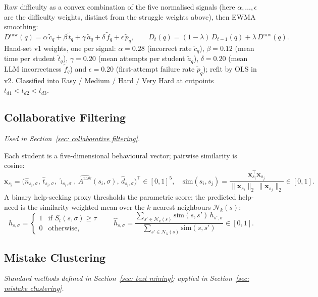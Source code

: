 Raw difficulty as a convex combination of the five normalised signals (here $\alpha,\ldots,\epsilon$ are the difficulty weights, distinct from the struggle weights above), then EWMA smoothing:
\[
    D^{\mathrm{raw}}(q)
    = \alpha\,\tilde{c}_{q} + \beta\,\tilde{t}_{q} + \gamma\,\tilde{a}_{q}
    + \delta\,\tilde{f}_{q} + \epsilon\,\tilde{p}_{q},
    \qquad
    D_t(q) = (1-\lambda)\,D_{t-1}(q) + \lambda\,D^{\mathrm{raw}}(q).
\]
Hand-set v1 weights, one per signal: $\alpha=0.28$ (incorrect rate $\tilde{c}_q$), $\beta=0.12$ (mean time per student $\tilde{t}_q$), $\gamma=0.20$ (mean attempts per student $\tilde{a}_q$), $\delta=0.20$ (mean LLM incorrectness $\tilde{f}_q$) and $\epsilon=0.20$ (first-attempt failure rate $\tilde{p}_q$); refit by OLS in v2. Classified into Easy / Medium / Hard / Very Hard at cutpoints $t_{d1} < t_{d2} < t_{d3}$.

\subsection{Collaborative Filtering}
\emph{Used in Section~\ref{sec: collaborative filtering}.}

Each student is a five-dimensional behavioural vector; pairwise similarity is cosine:
\[
    \mathbf{x}_{s_i} =
    \big(\hat{n}_{s_i,\sigma},\, \hat{t}_{s_i,\sigma},\, \hat{\imath}_{s_i,\sigma},\,
    \widehat{A^{\mathrm{raw}}}(s_i,\sigma),\, \hat{d}_{s_i,\sigma}\big)^{\top} \in [0,1]^5,
    \quad
    \mathrm{sim}(s_i,s_j) =
    \frac{\mathbf{x}_{s_i}^{\top}\mathbf{x}_{s_j}}{\|\mathbf{x}_{s_i}\|_2\,\|\mathbf{x}_{s_j}\|_2} \in [0,1].
\]
A binary help-seeking proxy thresholds the parametric score; the predicted help-need is the similarity-weighted mean over the $k$ nearest neighbours $\mathcal{N}_k(s)$:
\[
    h_{s,\sigma} =
    \begin{cases}
        1 & \text{if } S_t(s,\sigma) \geq \tau \\
        0 & \text{otherwise,}
    \end{cases}
    \qquad
    \hat{h}_{s,\sigma} =
    \frac{\sum_{s' \in \mathcal{N}_k(s)} \mathrm{sim}(s,s')\, h_{s',\sigma}}
         {\sum_{s' \in \mathcal{N}_k(s)} \mathrm{sim}(s,s')} \in [0,1].
\]

\subsection{Mistake Clustering}
\emph{Standard methods defined in Section~\ref{sec: text mining}; applied in Section~\ref{sec: mistake clustering}.}


